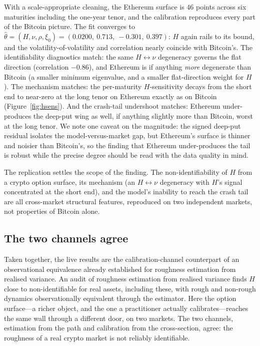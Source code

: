 \documentclass[11pt,a4paper]{article}
\numberwithin{equation}{section}
\begin{document}
With a scale-appropriate cleaning, the Ethereum surface is $46$ points across six maturities including
the one-year tenor, and the calibration reproduces every part of the Bitcoin picture. The fit converges
to $\hat\theta = (H,\nu,\rho,\xi_0) = (0.0200,\ 0.713,\ -0.301,\ 0.397)$: $H$ again rails to its bound,
and the volatility-of-volatility and correlation nearly coincide with Bitcoin's. The identifiability
diagnostics match: the same $H\leftrightarrow\nu$ degeneracy governs the flat direction (correlation
$-0.86$), and Ethereum is if anything \emph{more} degenerate than Bitcoin (a smaller minimum
eigenvalue, and a smaller flat-direction weight for $H$). The mechanism matches: the per-maturity
$H$-sensitivity decays from the short end to near-zero at the long tenor on Ethereum exactly as on
Bitcoin (Figure~\ref{fig:hsens}). And the crash-tail undershoot matches: Ethereum under-produces the
deep-put wing as well, if anything slightly more than Bitcoin, worst at the long tenor. We note one
caveat on the magnitude: the signed deep-put residual isolates the model-versus-market gap, but
Ethereum's surface is thinner and noisier than Bitcoin's, so the finding that Ethereum under-produces
the tail is robust while the precise degree should be read with the data quality in mind.

The replication settles the scope of the finding. The non-identifiability of $H$ from a crypto option
surface, its mechanism (an $H\leftrightarrow\nu$ degeneracy with $H$'s signal concentrated at the
short end), and the model's inability to reach the crash tail are all cross-market structural
features, reproduced on two independent markets, not properties of Bitcoin alone.

\subsection{The two channels agree}

Taken together, the live results are the calibration-channel counterpart of an observational
equivalence already established for roughness estimation from realised variance. An audit of roughness
estimation from realised variance finds $H$ close to non-identifiable for real assets, including these,
with rough and non-rough dynamics observationally equivalent through the estimator. Here the option
surface---a richer object, and the one a practitioner actually calibrates---reaches the same wall
through a different door, on two markets. The two channels, estimation from the path and calibration
from the cross-section, agree: the roughness of a real crypto market is not reliably identifiable.
\end{document}
